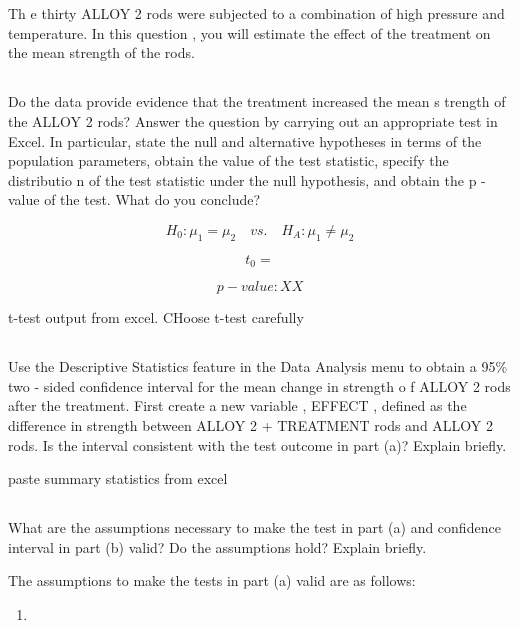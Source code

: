 \documentclass[letterpaper]{article}
\begin{document}
\section{}%
Th e  thirty  ALLOY  2  rods  were  subjected  to  a  combination  of  high
pressure  and  temperature.  In  this  question , you will estimate the effect
of the treatment on the mean strength of the rods.

\subsection{}%
Do the data provide evidence that the treatment increased the mean s trength of
the ALLOY 2  rods? Answer the question by carrying out an appropriate test in
Excel.  In particular, state  the null  and alternative hypotheses in terms of
the population parameters, obtain the value of the test  statistic,  specify the
distributio n of the test statistic under the null hypothesis, and obtain the  p
- value of the test.  What do you conclude?

$$H_0: \mu_1 = \mu_2  \quad vs. \quad H_A: \mu_1 \neq \mu_2  $$

$$t_0 =$$

$$ {p-value}: XX $$

t-test output from excel. CHoose t-test carefully

\subsection{}%
Use the  Descriptive Statistics feature in  the  Data Analysis menu to obtain a
95\%  two - sided  confidence interval for the mean change in strength o f ALLOY
2 rods after the treatment.   First create a new variable , EFFECT , defined as
the difference in strength between ALLOY 2 + TREATMENT rods and ALLOY 2 rods. Is
the interval consistent with the  test  outcome in part  (a)? Explain briefly.

paste summary statistics from excel

\subsection{}%
What are the  assumptions necessary to make the test in part (a) and confidence
interval in part (b)  valid?  Do the assumptions hold?  Explain briefly.

The assumptions to make the tests in part (a) valid are as follows:

\begin{enumerate}
 \item
\end{enumerate}
\end{document}
